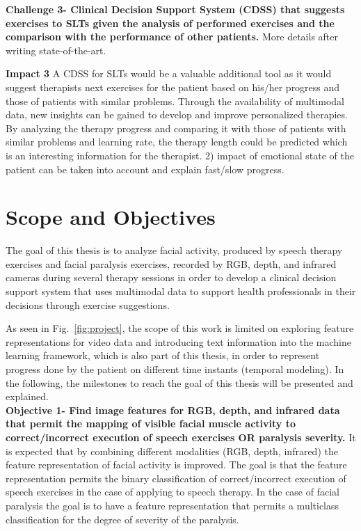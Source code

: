\textbf{Challenge 3- Clinical Decision Support System (CDSS) that suggests exercises to SLTs given the analysis of performed exercises and the comparison with the performance of other patients.} More details after writing state-of-the-art.

\textbf{Impact 3} A CDSS for SLTs would be a valuable additional tool as it would suggest therapists next exercises for the patient based on his/her progress and those of patients with similar problems. Through the availability of multimodal data, new insights can be gained to develop and improve personalized therapies. By analyzing the therapy progress and comparing it with those of patients with similar problems and learning rate, the therapy length could be predicted which is an interesting information for the therapist.
2) impact of emotional state of the patient can be taken into account and explain fast/slow progress.\\



\section{Scope and Objectives}

The goal of this thesis is to analyze facial activity, produced by speech therapy exercises and facial paralysis exercises, recorded by RGB, depth, and infrared cameras during several therapy sessions in order to develop a clinical decision support system that uses multimodal data to support health professionals in their decisions through exercise suggestions.

As seen in Fig.~\ref{fig:project}, the scope of this work is limited on exploring feature representations for video data and introducing text information into the machine learning framework, which is also part of this thesis, in order to represent progress done by the patient on different time instants (temporal modeling). In the following, the milestones to reach the goal of this thesis will be presented and explained. \\

\textbf{Objective 1- Find image features for RGB, depth, and infrared data that permit the mapping of visible facial muscle activity to correct/incorrect execution of speech exercises OR paralysis severity.} It is expected that by combining different modalities (RGB, depth, infrared) the feature representation of facial activity is improved. The goal is that the feature representation permits the binary classification of correct/incorrect execution of speech exercises in the case of applying to speech therapy. In the case of facial paralysis the goal is to have a feature representation that permits a multiclass classification for the degree of severity of the paralysis.\\


